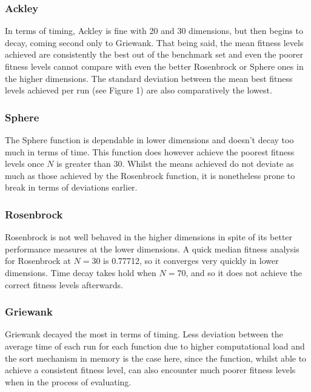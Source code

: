 \documentclass[KomodoMain.tex]{subfiles}
\begin{document}
\subsubsection{Ackley}

In terms of timing, Ackley is fine with 20 and 30 dimensions, but then begins to decay, coming second only to Griewank. That being said, the mean fitness levels achieved are consistently the best out of the benchmark set and even the poorer fitness levels cannot compare with even the better Rosenbrock or Sphere ones in the higher dimensions. The standard deviation between the mean best fitness levels achieved per run (see Figure 1) are also comparatively the lowest.

\subsubsection{Sphere}

The Sphere function is dependable in lower dimensions and doesn't decay too much in terms of time. This function does however achieve the poorest fitness levels once $N$ is greater than $30$. Whilst the means achieved do not deviate as much as those achieved by the Rosenbrock function, it is nonetheless prone to break in terms of deviations earlier.

\subsubsection{Rosenbrock}

Rosenbrock is not well behaved in the higher dimensions in spite of its better performance measures at the lower dimensions. A quick median fitness analysis for Rosenbrock at $N=30$ is 0.77712, so it converges very quickly in lower dimensions. Time decay takes hold when $N=70$, and so it does not achieve the correct fitness levels afterwards.

\subsubsection{Griewank}

Griewank decayed the most in terms of timing. Less deviation between the average time of each run for each function due to higher computational load and the sort mechanism in memory is the case here, since the function, whilst able to achieve a consistent fitness level, can also encounter much poorer fitness levels when in the process of evaluating.

\newpage
\end{document}
